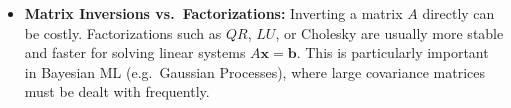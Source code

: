 \begin{itemize}
    \item \textbf{Matrix Inversions vs.\ Factorizations:} 
          Inverting a matrix $A$ directly can be costly. 
          Factorizations such as $QR$, $LU$, or Cholesky are usually more stable 
          and faster for solving linear systems $A \mathbf{x} = \mathbf{b}$. 
          This is particularly important in Bayesian ML (e.g.\ Gaussian Processes), 
          where large covariance matrices must be dealt with frequently.
\end{itemize}






